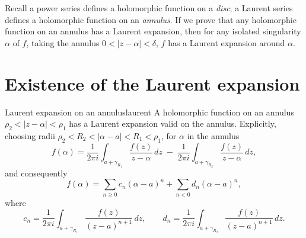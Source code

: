 \documentclass[11pt,openany]{report}
\newcommand{\abs}[1]{\left\lvert #1 \right\rvert}
\begin{document}
\begin{remark}
Recall a power series defines a holomorphic function on a \emph{disc}; a Laurent series
defines a holomorphic function on an \emph{annulus}. If we prove that any holomorphic
function on an annulus has a Laurent expansion, then for any isolated singularity $\alpha$
of $f$, taking the annulus $0<\abs{z-\alpha}<\delta$, $f$ has a Laurent expansion around
$\alpha$.
\end{remark}

\section{Existence of the Laurent expansion}

\begin{theorem}{Laurent expansion on an annulus}{laurent}
A holomorphic function on an annulus $\rho_2<\abs{z-\alpha}<\rho_1$ has a Laurent expansion
valid on the annulus. Explicitly, choosing radii $\rho_2<R_2<\abs{\alpha-a}<R_1<\rho_1$,
for $\alpha$ in the annulus
\[
  f(\alpha) = \frac{1}{2\pi i}\int_{a+\gamma_{R_1}}\frac{f(z)}{z-\alpha}\,dz
            \;-\; \frac{1}{2\pi i}\int_{a+\gamma_{R_2}}\frac{f(z)}{z-\alpha}\,dz ,
\]
and consequently
\[
  f(\alpha) = \sum_{n\ge0} c_n(\alpha-a)^n + \sum_{n<0} d_n(\alpha-a)^n ,
\]
where
\[
  c_n = \frac{1}{2\pi i}\int_{a+\gamma_{R_1}}\frac{f(z)}{(z-a)^{n+1}}\,dz,
  \qquad
  d_n = \frac{1}{2\pi i}\int_{a+\gamma_{R_2}}\frac{f(z)}{(z-a)^{n+1}}\,dz .
\]
\end{theorem}
\end{document}
